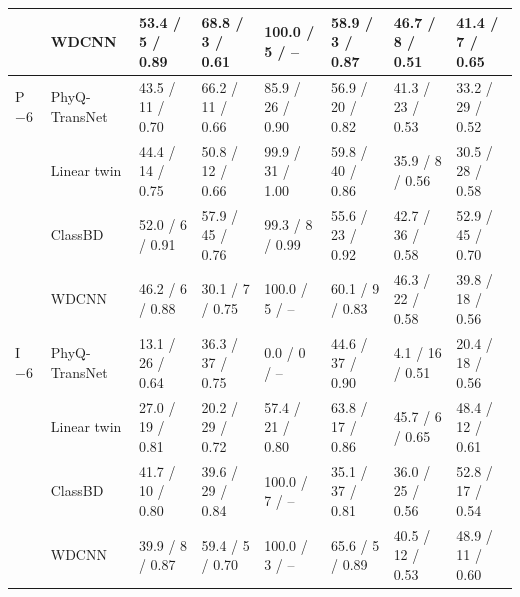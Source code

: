\begin{table}[p]
{\begin{tabular}{llllllll}
 & WDCNN & 53.4 / 5 / 0.89 & 68.8 / 3 / 0.61 & 100.0 / 5 / -- & 58.9 / 3 / 0.87 & 46.7 / 8 / 0.51 & 41.4 / 7 / 0.65 \\
\midrule
P $-6$ & PhyQ-TransNet & 43.5 / 11 / 0.70 & 66.2 / 11 / 0.66 & 85.9 / 26 / 0.90 & 56.9 / 20 / 0.82 & 41.3 / 23 / 0.53 & 33.2 / 29 / 0.52 \\
 & Linear twin & 44.4 / 14 / 0.75 & 50.8 / 12 / 0.66 & 99.9 / 31 / 1.00 & 59.8 / 40 / 0.86 & 35.9 / 8 / 0.56 & 30.5 / 28 / 0.58 \\
 & ClassBD & 52.0 / 6 / 0.91 & 57.9 / 45 / 0.76 & 99.3 / 8 / 0.99 & 55.6 / 23 / 0.92 & 42.7 / 36 / 0.58 & 52.9 / 45 / 0.70 \\
 & WDCNN & 46.2 / 6 / 0.88 & 30.1 / 7 / 0.75 & 100.0 / 5 / -- & 60.1 / 9 / 0.83 & 46.3 / 22 / 0.58 & 39.8 / 18 / 0.56 \\
\midrule
I $-6$ & PhyQ-TransNet & 13.1 / 26 / 0.64 & 36.3 / 37 / 0.75 & 0.0 / 0 / -- & 44.6 / 37 / 0.90 & 4.1 / 16 / 0.51 & 20.4 / 18 / 0.56 \\
 & Linear twin & 27.0 / 19 / 0.81 & 20.2 / 29 / 0.72 & 57.4 / 21 / 0.80 & 63.8 / 17 / 0.86 & 45.7 / 6 / 0.65 & 48.4 / 12 / 0.61 \\
 & ClassBD & 41.7 / 10 / 0.80 & 39.6 / 29 / 0.84 & 100.0 / 7 / -- & 35.1 / 37 / 0.81 & 36.0 / 25 / 0.56 & 52.8 / 17 / 0.54 \\
 & WDCNN & 39.9 / 8 / 0.87 & 59.4 / 5 / 0.70 & 100.0 / 3 / -- & 65.6 / 5 / 0.89 & 40.5 / 12 / 0.53 & 48.9 / 11 / 0.60 \\
\bottomrule
\end{tabular}}
\end{table}
